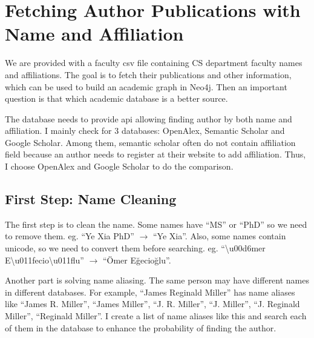 \documentclass[../report.tex]{subfiles}
\begin{document}
\section{Fetching Author Publications with Name and Affiliation}

\hspace{0.5cm}We are provided with a faculty csv file containing CS department faculty names and affiliations. The goal is to fetch their publications and other information, which can be used to build an academic graph in Neo4j. Then an important question is that which academic database is a better source. 
\par
The database needs to provide api allowing finding author by both name and affiliation. I mainly check for 3 databases: OpenAlex, Semantic Scholar and Google Scholar. Among them, semantic scholar often do not contain affiliation field because an author needs to register at their website to add affiliation. Thus, I choose OpenAlex and Google Scholar to do the comparison.

\subsection{First Step: Name Cleaning}
\hspace{0.5cm}The first step is to clean the name. Some names have ``MS'' or ``PhD'' so we need to remove them. eg. ``Ye Xia PhD'' $\rightarrow$ ``Ye Xia''. Also, some names contain unicode, so we need to convert them before searching. eg. ``\textbackslash u00d6mer E\textbackslash u011fecio\textbackslash u011flu'' $\rightarrow$ ``Ömer Eğecioğlu''.

\par
Another part is solving name aliasing. The same person may have different names in different databases. For example, ``James Reginald Miller'' has name aliases like ``James R. Miller'', ``James Miller'', ``J. R. Miller'', ``J. Miller'', ``J. Reginald Miller'', ``Reginald Miller''. I create a list of name aliases like this and search each of them in the database to enhance the probability of finding the author.
\end{document}
